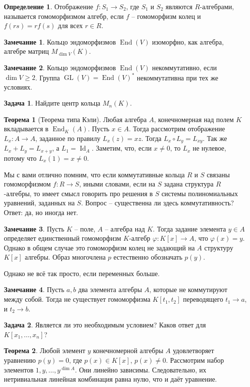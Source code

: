 \documentclass[10pt,a4paper,oneside]{book}
\theoremstyle{definition}
\newtheorem*{rem}{Замечание}
\newtheorem{zad}{Задача}
\newtheorem*{defn}{Определение}
\newtheorem{thm}{Теорема}
\newcommand{\id}{\operatorname{Id}}
\newcommand{\End}{\operatorname{End}}
\newcommand{\GL}{\operatorname{GL}}
\def\ffi{\varphi}
\def\thrm{\begin{thm}}
\def\ethrm{\end{thm}}
\def\dfn{\begin{defn}}
\def\edfn{\end{defn}}
\def\zd{\begin{zad}}
\def\ezd{\end{zad}}
\def\rm{\begin{rem}}
\def\erm{\end{rem}}
\begin{document}
\dfn Отображение $f \colon S_1 \to S_2$, где $S_1$ и $S_2$ являются $R$-алгебрами,
называется гомоморфизмом алгебр, если $f$ -- гомоморфизм колец и $f(rs)=rf(s)$ для всех $r \in R$.
\edfn



\rm Кольцо эндоморфизмов $\End(V)$  изоморфно, как алгебра, алгебре матриц $M_{\dim V}(K)$.
\erm

\rm Кольцо эндоморфизмов $\End(V)$ некоммутативно, если $\dim V \geq 2$. Группа $\GL(V)=\End(V)^*$ некоммутативна при тех же условиях.
\erm

\zd Найдите центр кольца $M_n(K)$.
\ezd






\thrm[Теорема типа Кэли] Любая алгебра $A$, конечномерная над полем $K$ вкладывается в $\End_K(A)$.
\proof Пусть $x\in A$. Тогда рассмотрим отображение $L_x \colon A \to A$, заданное по правилу $L_x(z)=xz$. Тогда $L_x\circ L_y=L_{xy}$. Так же $L_x+L_y=L_{x+y}$, а $L_1=\id_A$. Заметим, что, если $x\neq 0$, то $L_x$ не нулевое, потому что $L_x(1)=x\neq 0$.
\endproof
\ethrm

Мы с вами отлично помним, что если коммутативные кольца $R$ и $S$ связаны гомоморфизмом $f\colon R \to S$, иными словами, если на $S$ задана структура $R$-алгебры, то имеет смысл говорить про решения в $S$ системы полиномиальных уравнений, заданных на $S$. Вопрос -- существенна ли здесь коммутативность? Ответ: да, но иногда нет.

\rm
Пусть $K$ -- поле, $A$ -- алгебра над $K$. Тогда задание элемента $y \in A$ определяет единственный гомоморфизм $K$-алгебр $\ffi \colon K[x]\to A$, что $\ffi(x)= y$. Однако в общем случае это  гомоморфизм колец не задающий на $A$ структуру $K[x]$ алгебры. Образ многочлена $p$ естественно обозначать $p(y)$.
\erm

Однако не всё так просто, если переменных больше.

\rm Пусть $a,b$ два элемента алгебры $A$, которые не коммутируют между собой. Тогда не существует гомоморфизма $K[t_1,t_2]$ переводящего $t_1\to a$, и $t_2 \to b$.
\erm

\zd Является ли это необходимым условием? Каков ответ для $K[x_1,\dots,x_n]$?
\ezd




\thrm Любой элемент $y$ конечномерной алгебры $A$ удовлетворяет уравнению $p(y)=0$, где $p(x)\in K[x]$, $p(x)\neq 0$.
\proof Рассмотрим набор элементов $1,y,\dots, y^{\dim A}$. Они линейно зависимы. Следовательно, их нетривиальная линейная комбинация равна нулю, что и даёт уравнение.
\endproof
\ethrm
\end{document}

